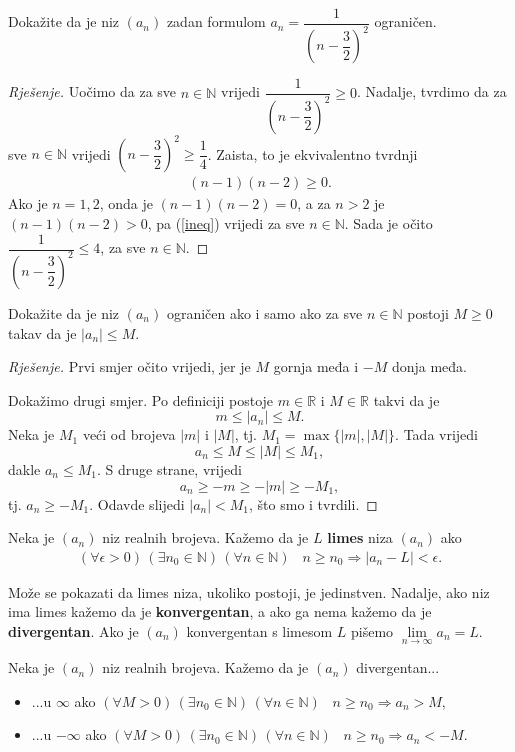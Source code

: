 \begin{exercise}
Dokažite da je niz $(a_n)$ zadan formulom $a_n=\dfrac{1}{\left(n-\dfrac{3}{2}\right)^2}$ ograničen.
\end{exercise}
\begin{proof}[Rješenje]
Uočimo da za sve $n\in \mathbb{N}$ vrijedi $\dfrac{1}{\left(n-\dfrac{3}{2}\right)^2}\geq 0$. Nadalje, tvrdimo da za sve $n\in \mathbb{N}$ vrijedi $\left(n-\dfrac{3}{2}\right)^2\geq \dfrac{1}{4}$. Zaista, to je ekvivalentno tvrdnji 
\begin{gather}
\label{ineq}
(n-1)(n-2)\geq 0.
\end{gather}
Ako je $n=1, 2$, onda je $(n-1)(n-2)=0$, a za $n>2$ je $(n-1)(n-2)>0$, pa (\ref{ineq}) vrijedi za sve $n\in \mathbb{N}$. Sada je očito $\dfrac{1}{\left(n-\dfrac{3}{2}\right)^2}\leq 4$, za sve $n\in \mathbb{N}$.
\end{proof}
\begin{exercise}
Dokažite da je niz $(a_n)$ ograničen ako i samo ako za sve $n\in \mathbb{N}$ postoji $M\geq 0$ takav da je $|a_n|\leq M$.
\end{exercise}
\begin{proof}[Rješenje]
Prvi smjer očito vrijedi, jer je $M$ gornja međa i $-M$ donja međa. 

Dokažimo drugi smjer. Po definiciji postoje $m\in \mathbb{R}$ i $M\in \mathbb{R}$ takvi da je $$m\leq |a_n|\leq M.$$ Neka je $M_1$ veći od brojeva $|m|$ i $|M|$, tj. $M_1=\max\{|m|, |M|\}$. Tada vrijedi $$a_n\leq M\leq |M|\leq M_1,$$
dakle $a_n\leq M_1$. S druge strane, vrijedi $$a_n\geq -m\geq -|m|\geq -M_1,$$ 
tj. $a_n\geq -M_1$. Odavde slijedi $|a_n|<M_1$, što smo i tvrdili.
\end{proof}

\begin{definition}
Neka je $(a_n)$ niz realnih brojeva. Kažemo da je $L$ \textbf{limes} niza $(a_n)$ ako
\begin{gather*}
(\forall \epsilon>0)\,(\exists n_0\in \mathbb{N})\, (\forall n\in \mathbb{N})\;\;\; n\geq n_0\Rightarrow |a_n-L|<\epsilon.
\end{gather*}
\end{definition}

Može se pokazati da limes niza, ukoliko postoji, je jedinstven. Nadalje, ako niz ima limes kažemo da je \textbf{konvergentan}, a ako ga nema kažemo da je \textbf{divergentan}. Ako je $(a_n)$ konvergentan s limesom $L$ pišemo $\lim\limits_{n\to \infty}{a_n}=L$.

\begin{definition}
Neka je $(a_n)$ niz realnih brojeva. Kažemo da je $(a_n)$ divergentan...
\begin{itemize}
\item ...u $\mathbb{\infty}$ ako $(\forall M>0)\,(\exists n_0\in \mathbb{N})\,(\forall n\in \mathbb{N})\;\;\; n\geq n_0\Rightarrow a_n>M,$

\item ...u $-\mathbb{\infty}$ ako $(\forall M>0)\,(\exists n_0\in \mathbb{N})\,(\forall n\in \mathbb{N})\;\;\; n\geq n_0\Rightarrow a_n<-M.$
\end{itemize}
\end{definition}

